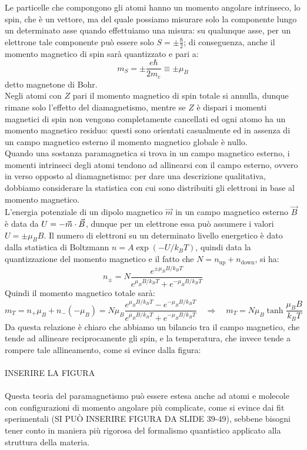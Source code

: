 Le particelle che compongono gli atomi hanno un momento angolare intrinseco, lo spin, che è un vettore, ma del quale possiamo misurare solo la componente lungo un determinato asse quando effettuiamo una misura: su qualunque asse, per un elettrone tale componente può essere solo $ S = \pm\frac{\hbar}{2} $; di conseguenza, anche il momento magnetico di spin sarà quantizzato e pari a:
\begin{equation}
	m_S = \pm\frac{e\hbar}{2m_e} \equiv \pm\mu_B
	\label{eq:9}
\end{equation}
detto magnetone di Bohr. \\ 
%
Negli atomi con $ Z $ pari il momento magnetico di spin totale si annulla, dunque rimane solo l'effetto del diamagnetismo, mentre se $ Z $ è dispari i momenti magnetici di spin non vengono completamente cancellati ed ogni atomo ha un momento magnetico residuo: questi sono orientati casualmente ed in assenza di un campo magnetico esterno il momento magnetico globale è nullo. \\ 
%
Quando una sostanza paramagnetica si trova in un campo magnetico esterno, i momenti intrinseci degli atomi tendono ad allinearsi con il campo esterno, ovvero in verso opposto al diamagnetismo: per dare una descrizione qualitativa, dobbiamo considerare la statistica con cui sono distribuiti gli elettroni in base al momento magnetico. \\ 
%
L'energia potenziale di un dipolo magnetico $ \vec{m} $ in un campo magnetico esterno $ \vec{B} $ è data da $ U = - \vec{m}\cdot\vec{B} $, dunque per un elettrone essa può assumere i valori $ U = \pm\mu_B B $. Il numero di elettroni su un determinato livello energetico è dato dalla statistica di Boltzmann $ n = A \exp(-U/k_B T) $, quindi data la quantizzazione del momento magnetico e il fatto che $ N = n_{\text{up}} + n_{\text{down}} $, si ha:
\begin{equation}
	n_{\pm} = N \frac{e^{\pm\mu_B B / k_B T}}{e^{\mu_B B / k_B T} + e^{-\mu_B B / k_B T}}
	\label{eq:10}
\end{equation}
Quindi il momento magnetico totale sarà:
\begin{equation}
	m_T = n_+ \mu_B + n_- (-\mu_B) = N\mu_B \frac{e^{\mu_B B / k_B T} - e^{-\mu_B B / k_B T}}{e^{\mu_B B / k_B T} + e^{-\mu_B B / k_B T}} \quad\Longrightarrow\quad m_T = N\mu_B \tanh\frac{\mu_B B}{k_B T}
	\label{eq:11}
\end{equation}
Da questa relazione è chiaro che abbiamo un bilancio tra il campo magnetico, che tende ad allineare reciprocamente gli spin, e la temperatura, che invece tende a rompere tale allineamento, come si evince dalla figura: \\ 
%
%
%
\hbox{}\\ INSERIRE LA FIGURA\\ \hbox{}\\ 
%
%
%
Questa teoria del paramagnetismo può essere estesa anche ad atomi e molecole con configurazioni di momento angolare più complicate, come si evince dai fit sperimentali (SI PUÒ INSERIRE FIGURA DA SLIDE 39-49), sebbene bisogni tener conto in maniera più rigorosa del formalismo quantistico applicato alla struttura della materia.


